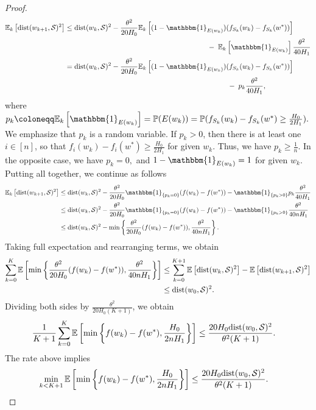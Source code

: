 \documentclass[a4paper,11pt]{article}
\newcommand{\E}[1]{\mathbb{E}\left[#1\right]}
\newcommand{\Ek}[1]{\mathbb{E}_k\left[#1\right]}
\newcommand{\cS}{\mathcal{S}}
\newcommand{\Prob}{\mathbb{P}}
\newcommand{\1}{\mathbbm{1}}
\newcommand{\eqdef}{\coloneqq}
\theoremstyle{plain}
\begin{document}
\begin{proof}
\begin{align}
       \Ek{{\rm dist}(w_{k+1},\cS)^2 }
            &\le {\rm dist}(w_k,\cS)^2 - \frac{\theta^2}{20H_0}\Ek{(1-\1_{E(w_k)})(f_{S_k}(w_k)-f_{S_k}(w^*))}\notag\\
            &\hspace{7cm} -\; \Ek{\1_{E(w_k)}}\frac{\theta^2}{40 H_1}\notag\\
            &= {\rm dist}(w_k,\cS)^2 - \frac{\theta^2}{20H_0}\Ek{(1-\1_{E(w_k)})(f_{S_k}(w_k)-f_{S_k}(w^*))}\notag\\
            &\hspace{8cm} -\; p_k\frac{\theta^2}{40 H_1},
    \end{align}
    where $p_k \eqdef \Ek{\1_{E(w_k)}} = \Prob(E(w_k)) = \Prob(f_{S_k}(w_k) - f_{S_k}(w^*) \ge \frac{H_0}{2H_1}).$ We emphasize that $p_k$ is a random variable. If $p_k > 0$, then there is at least one $i\in[n]$, so that $f_{i}(w_k)-f_{i}(w^*) \ge \frac{H_0}{2H_1}$ for given $w_k.$ Thus, we have $p_k \ge \frac{1}{n}.$ In the opposite case, we have $p_k=0,$ and $1-\1_{E(w_k)} = 1$ for given $w_k.$ Putting all together, we continue as follows 
    \begin{align*}
        \Ek{{\rm dist}(w_{k+1},\cS)^2}
            &\le {\rm dist}(w_k,\cS)^2 - \frac{\theta^2}{20H_0}\1_{\{p_k=0\}}(f(w_k)-f(w^*)) - \1_{\{p_k > 0\}}p_k\frac{\theta^2}{40 H_1}\notag\\
            &\le {\rm dist}(w_k,\cS)^2 - \frac{\theta^2}{20H_0}\1_{\{p_k=0\}}(f(w_k)-f(w^*)) - \1_{\{p_k > 0\}}\frac{\theta^2}{40n H_1}\notag\\
            &\le {\rm dist}(w_k,\cS)^2 - \min\left\{\frac{\theta^2}{20H_0}(f(w_k)-f(w^*)), \frac{\theta^2}{40n H_1}\right\}.
    \end{align*}
    Taking full expectation and rearranging terms, we obtain
    \begin{align*}
         \sum_{k=0}^{K}\E{\min\left\{\frac{\theta^2}{20H_0}(f(w_k)-f(w^*)), \frac{\theta^2}{40n H_1}\right\}} 
         &\le \sum_{k=0}^{K+1} \E{{\rm dist}(w_k,\cS)^2} - \E{{\rm dist}(w_{k+1},\cS)^2}\\
         &\le {\rm dist}(w_0,\cS)^2.
    \end{align*}
    Dividing both sides by $\frac{\theta^2}{20H_0(K+1)}$, we obtain 
    \begin{align*}
         \frac{1}{K+1}\sum_{k=0}^{K}\E{\min\left\{f(w_k)-f(w^*), \frac{H_0}{2n H_1}\right\}} 
         &\le \frac{20H_0{\rm dist}(w_0,\cS)^2}{\theta^2(K+1)}.
    \end{align*}
    The rate above implies 
    \begin{align*}
         \min_{k<K+1}\E{\min\left\{f(w_k)-f(w^*), \frac{H_0}{2n H_1}\right\}} 
         &\le \frac{20H_0{\rm dist}(w_0,\cS)^2}{\theta^2(K+1)}.
    \end{align*}
\end{proof}
\end{document}
